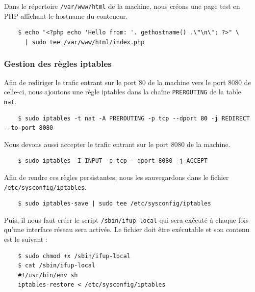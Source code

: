 \documentclass{extarticle} %
\begin{document}
    Dans le répertoire \texttt{/var/www/html} de la machine, nous créons une page test en PHP affichant 
    le hostname du conteneur.

    \begin{verbatim}
    $ echo "<?php echo 'Hello from: '. gethostname() .\"\n\"; ?>" \
      | sudo tee /var/www/html/index.php
    \end{verbatim}

    \subsubsection{Gestion des règles iptables}

    Afin de rediriger le trafic entrant sur le port 80 de la machine vers le
    port 8080 de celle-ci, nous ajoutons une règle iptables dans la chaîne \texttt{PREROUTING} de la table \texttt{nat}.

    \begin{verbatim}
    $ sudo iptables -t nat -A PREROUTING -p tcp --dport 80 -j REDIRECT --to-port 8080
    \end{verbatim}

    Nous devons aussi accepter le trafic entrant sur le port 8080 de la machine.

    \begin{verbatim}
    $ sudo iptables -I INPUT -p tcp --dport 8080 -j ACCEPT
    \end{verbatim}

    Afin de rendre ces règles persistantes, nous les sauvegardons dans le fichier \texttt{/etc/sysconfig/iptables}.

    \begin{verbatim}
    $ sudo iptables-save | sudo tee /etc/sysconfig/iptables
    \end{verbatim}

    Puis, il nous faut créer le script \texttt{/sbin/ifup-local} qui sera exécuté à chaque fois qu'une
     interface réseau sera activée. Le fichier doit être exécutable et son contenu est le suivant :

    \begin{verbatim}
    $ sudo chmod +x /sbin/ifup-local
    $ cat /sbin/ifup-local
    #!/usr/bin/env sh
    iptables-restore < /etc/sysconfig/iptables
    \end{verbatim}
\end{document}
